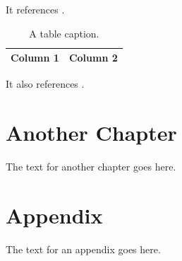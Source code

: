\documentclass[a4paper]{phdthesis}
\begin{document}
It references .

\begin{table}
  \center
  \caption{A table caption.\label{tab:1}}
  \begin{tabular}{cc}
    \toprule
    Column 1 & Column 2\\
    \bottomrule
  \end{tabular}
\end{table}

It also references .

\chapter{Another Chapter}
The text for another chapter goes here.

\appendix
\chapter{Appendix}
The text for an appendix goes here.

\backmatter
%
%
\end{document}

